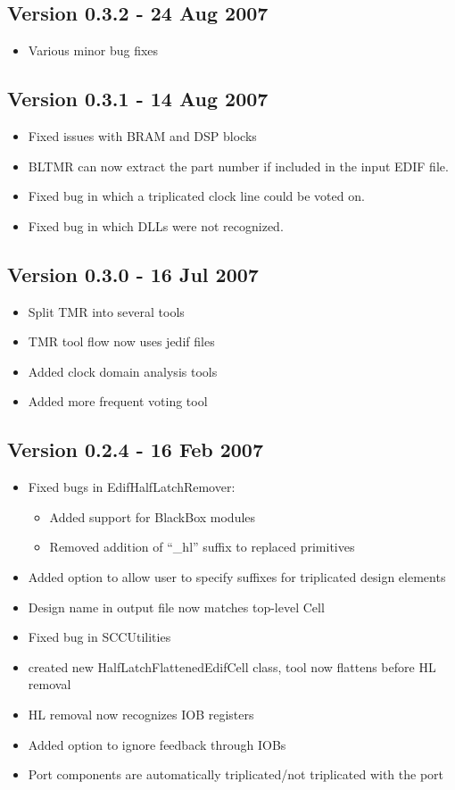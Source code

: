 \documentclass[english]{article}
\numberwithin{figure}{section}
\begin{document}
\subsection*{Version 0.3.2 - 24 Aug 2007}
\begin{itemize}
\item Various minor bug fixes
\end{itemize}

\subsection*{Version 0.3.1 - 14 Aug 2007}
\begin{itemize}
\item Fixed issues with BRAM and DSP blocks
\item BLTMR can now extract the part number if included in the input EDIF file.
\item Fixed bug in which a triplicated clock line could be voted on.
\item Fixed bug in which DLLs were not recognized.
\end{itemize}

\subsection*{Version 0.3.0 - 16 Jul 2007}
\begin{itemize}
\item Split TMR into several tools
\item TMR tool flow now uses jedif files
\item Added clock domain analysis tools
\item Added more frequent voting tool
\end{itemize}

\subsection*{Version 0.2.4 - 16 Feb 2007}
\begin{itemize}
\item Fixed bugs in EdifHalfLatchRemover: 
\begin{itemize}
\item Added support for BlackBox modules
\item Removed addition of ``\_hl'' suffix to replaced primitives
\end{itemize}
\item Added option to allow user to specify suffixes for triplicated design
elements
\item Design name in output file now matches top-level Cell
\item Fixed bug in SCCUtilities
\item created new HalfLatchFlattenedEdifCell class, tool now flattens before HL
removal
\item HL removal now recognizes IOB registers
\item Added option to ignore feedback through IOBs
\item Port components are automatically triplicated/not triplicated with the port
\end{itemize}
\end{document}
